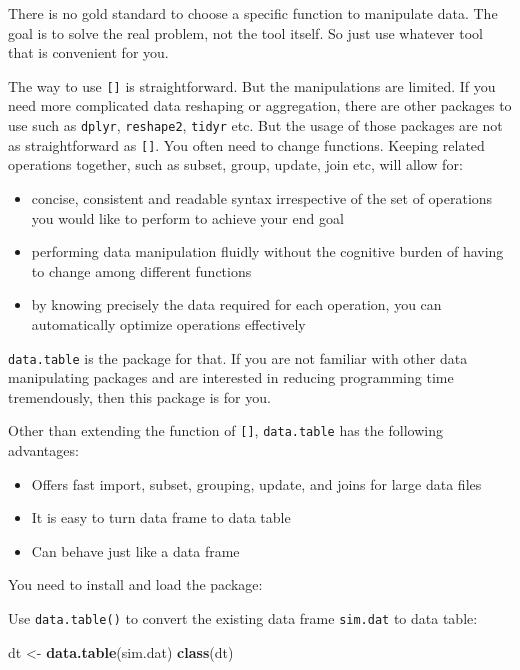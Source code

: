 \documentclass[12pt,]{krantz}
\makeatletter
\newenvironment{Shaded}{\begin{snugshade}}{\end{snugshade}}
\newcommand{\KeywordTok}[1]{\textcolor[rgb]{0.27,0.27,0.27}{\textbf{#1}}}
\newcommand{\NormalTok}[1]{#1}
\newcommand{\StringTok}[1]{\textcolor[rgb]{0.5,0.5,0.5}{#1}}
\providecommand{\tightlist}{%
  \setlength{\itemsep}{0pt}\setlength{\parskip}{0pt}}
\newenvironment{kframe}{%
\medskip{}
\setlength{\fboxsep}{.8em}
 \def\at@end@of@kframe{}%
 \ifinner\ifhmode%
  \def\at@end@of@kframe{\end{minipage}}%
  \begin{minipage}{\columnwidth}%
 \fi\fi%
 \def\FrameCommand##1{\hskip\@totalleftmargin \hskip-\fboxsep
 \colorbox{shadecolor}{##1}\hskip-\fboxsep
     \hskip-\linewidth \hskip-\@totalleftmargin \hskip\columnwidth}%
 \MakeFramed {\advance\hsize-\width
   \@totalleftmargin\z@ \linewidth\hsize
   \@setminipage}}%
 {\par\unskip\endMakeFramed%
 \at@end@of@kframe}
\renewenvironment{Shaded}{\begin{kframe}}{\end{kframe}}
\makeatother
\begin{document}
There is no gold standard to choose a specific function to manipulate data. The goal is to solve the real problem, not the tool itself. So just use whatever tool that is convenient for you.

The way to use \texttt{{[}{]}} is straightforward. But the manipulations are limited. If you need more complicated data reshaping or aggregation, there are other packages to use such as \texttt{dplyr}, \texttt{reshape2}, \texttt{tidyr} etc. But the usage of those packages are not as straightforward as \texttt{{[}{]}}. You often need to change functions. Keeping related operations together, such as subset, group, update, join etc, will allow for:

\begin{itemize}
\tightlist
\item
  concise, consistent and readable syntax irrespective of the set of operations you would like to perform to achieve your end goal
\item
  performing data manipulation fluidly without the cognitive burden of having to change among different functions
\item
  by knowing precisely the data required for each operation, you can automatically optimize operations effectively
\end{itemize}

\texttt{data.table} is the package for that. If you are not familiar with other data manipulating packages and are interested in reducing programming time tremendously, then this package is for you.

Other than extending the function of \texttt{{[}{]}}, \texttt{data.table} has the following advantages:

\begin{itemize}
\tightlist
\item
  Offers fast import, subset, grouping, update, and joins for large data files
\item
  It is easy to turn data frame to data table
\item
  Can behave just like a data frame
\end{itemize}

You need to install and load the package:

Use \texttt{data.table()} to convert the existing data frame \texttt{sim.dat} to data table:

\begin{Shaded}
\begin{Highlighting}[]
\NormalTok{dt <-}\StringTok{ }\KeywordTok{data.table}\NormalTok{(sim.dat)}
\KeywordTok{class}\NormalTok{(dt)}
\end{Highlighting}
\end{Shaded}
\end{document}
